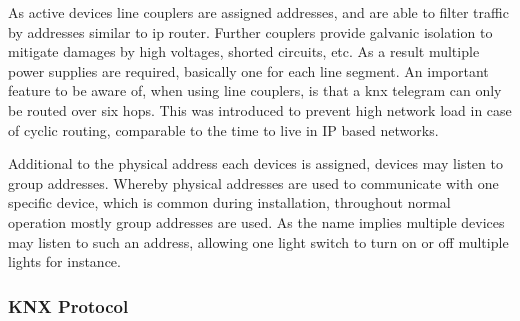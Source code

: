 As active devices line couplers are assigned addresses, and are able to filter traffic by addresses similar to \gls{ip} router. %
Further couplers provide galvanic isolation to mitigate damages by high voltages, shorted circuits, etc. As a result multiple power supplies are required, basically one for each line segment.
An important feature to be aware of, when using line couplers, is that a \gls{knx} telegram can only be routed over six hops. This was introduced to prevent high network load in case of cyclic routing, comparable to the time to live in IP based networks. \parencite{Sokollik2017}



Additional to the physical address each devices is assigned, devices may listen to group addresses.
Whereby physical addresses are used to communicate with one specific device, which is common during installation, throughout normal operation mostly group addresses are used. As the name implies multiple devices may listen to such an address, allowing one light switch to turn on or off multiple lights for instance.

\subsubsection{KNX Protocol}
\label{sec:background:bas:knx:proto}

